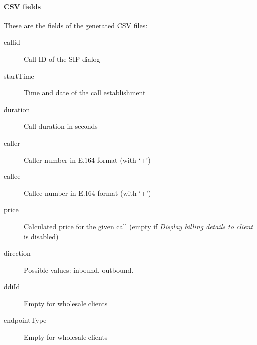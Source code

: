 \documentclass[letterpaper,10pt,spanish]{sphinxmanual}
\begin{document}
\paragraph{CSV fields}
\label{administration_portal/client/wholesale/calls/call_csv_schedulers:csv-fields}
These are the fields of the generated CSV files:
\begin{description}
\item[{callid}] \leavevmode{}\label{administration_portal/client/wholesale/calls/call_csv_schedulers:term-callid}
Call-ID of the SIP dialog

\item[{startTime}] \leavevmode{}\label{administration_portal/client/wholesale/calls/call_csv_schedulers:term-starttime}
Time and date of the call establishment

\item[{duration}] \leavevmode{}\label{administration_portal/client/wholesale/calls/call_csv_schedulers:term-duration}
Call duration in seconds

\item[{caller}] \leavevmode{}\label{administration_portal/client/wholesale/calls/call_csv_schedulers:term-caller}
Caller number in E.164 format (with `+')

\item[{callee}] \leavevmode{}\label{administration_portal/client/wholesale/calls/call_csv_schedulers:term-callee}
Callee number in E.164 format (with `+')

\item[{price}] \leavevmode{}\label{administration_portal/client/wholesale/calls/call_csv_schedulers:term-price}
Calculated price for the given call (empty if \emph{Display billing details to client} is disabled)

\item[{direction}] \leavevmode{}\label{administration_portal/client/wholesale/calls/call_csv_schedulers:term-12}
Possible values: inbound, outbound.

\item[{ddiId}] \leavevmode{}\label{administration_portal/client/wholesale/calls/call_csv_schedulers:term-ddiid}
Empty for wholesale clients

\item[{endpointType}] \leavevmode{}\label{administration_portal/client/wholesale/calls/call_csv_schedulers:term-endpointtype}
Empty for wholesale clients


\end{description}
\end{document}
